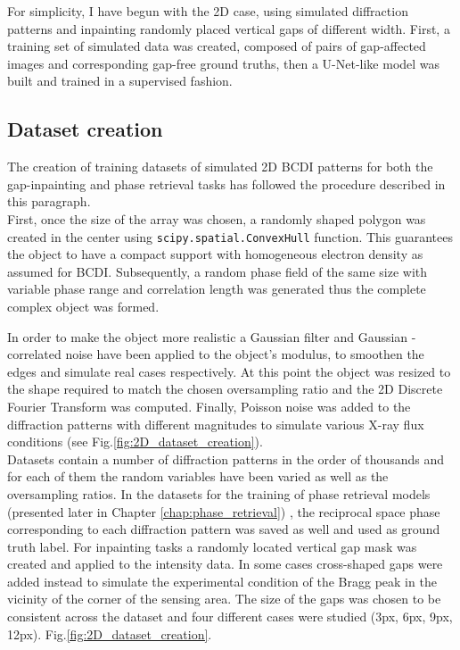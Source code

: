 For simplicity, I have begun with the 2D case, using simulated diffraction patterns and inpainting randomly placed 
vertical gaps of different width. First, a training set of simulated data was created, composed of pairs of gap-affected 
images and corresponding gap-free ground truths, then a U-Net-like model was built and trained in a supervised fashion.

\subsection{Dataset creation}\label{sec:dataset_creation2D}

The creation of training datasets of simulated 2D BCDI patterns for both the gap-inpainting and phase retrieval tasks has followed the procedure
described in this paragraph.\\
First, once the size of the array was chosen, a randomly shaped polygon was created in the center using 
\texttt{scipy.spatial.ConvexHull} function. This guarantees the object to have a compact support with homogeneous electron 
density as assumed for BCDI. Subsequently, a random phase field of the same size with variable phase range and correlation 
length was generated thus the complete complex object was formed.

In order to make the object more realistic a Gaussian filter and Gaussian - correlated noise \cite{Gaussian_noise1984} 
have been applied to the 
object's modulus, to smoothen the edges and simulate real cases respectively. At this point the object was resized 
to the shape required to match the chosen oversampling ratio and the 2D Discrete Fourier Transform was computed. Finally, 
Poisson noise was added to the diffraction patterns with different magnitudes to simulate 
various X-ray flux conditions (see Fig.\ref{fig:2D_dataset_creation}). \\
Datasets contain a number of diffraction patterns in the order of thousands and for each of them the random variables 
have been varied as well as the oversampling ratios. In the datasets for the training of phase retrieval models (presented 
later in Chapter \ref{chap:phase_retrieval}) , 
the reciprocal space phase corresponding to each diffraction pattern was saved as well and used as ground truth label. 
For inpainting tasks a randomly located vertical gap mask was created and applied to the intensity data. In some cases 
cross-shaped gaps were added instead to simulate the experimental condition of the Bragg peak in the vicinity of the 
corner of the sensing area. The size of the gaps was chosen to be consistent across the dataset and four different 
cases were studied (3px, 6px, 9px, 12px). Fig.\ref{fig:2D_dataset_creation}. 

